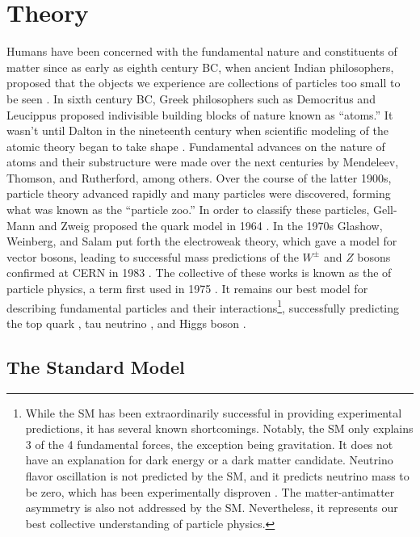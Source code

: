 \chapter{Theory}

    Humans have been concerned with the fundamental nature and constituents of matter since as early as eighth century BC, when ancient Indian philosophers, proposed that the objects we experience are collections of particles too small to be seen \cite{indian-atomism}. In sixth century BC, Greek philosophers such as Democritus and Leucippus proposed indivisible building blocks of nature known as ``atoms.'' It wasn't until Dalton in the nineteenth century when scientific modeling of the atomic theory began to take shape \cite{dalton}. Fundamental advances on the nature of atoms and their substructure were made over the next centuries by Mendeleev, Thomson, and Rutherford, among others. Over the course of the latter 1900s, particle theory advanced rapidly and many particles were discovered, forming what was known as the ``particle zoo.'' In order to classify these particles, Gell-Mann and Zweig proposed the quark model in 1964 \cite{quark-model}. In the 1970s Glashow, Weinberg, and Salam put forth the electroweak theory, which gave a model for vector bosons, leading to successful mass predictions of the $W^{\pm}$ and $Z$ bosons confirmed at \gls{CERN} in 1983 \cite{w-discovery, z-discovery}. The collective of these works is known as the  of particle physics, a term first used in 1975 \cite{conceptual-developments-text}. It remains our best model for describing fundamental particles and their interactions\footnote{While the \gls{SM} has been extraordinarily successful in providing experimental predictions, it has several known shortcomings. Notably, the \gls{SM} only explains 3 of the 4 fundamental forces, the exception being gravitation. It does not have an explanation for dark energy or a dark matter candidate. Neutrino flavor oscillation is not predicted by the \gls{SM}, and it predicts neutrino mass to be zero, which has been experimentally disproven \cite{neutrino-oscillation}. The matter-antimatter asymmetry is also not addressed by the \gls{SM}. Nevertheless, it represents our best collective understanding of particle physics.}, successfully predicting the top quark \cite{top-quark}, tau neutrino \cite{tau-neutrino}, and Higgs boson \cite{higgs-discovery-atlas,higgs-discovery-cms}.
    

    \section{The Standard Model}

